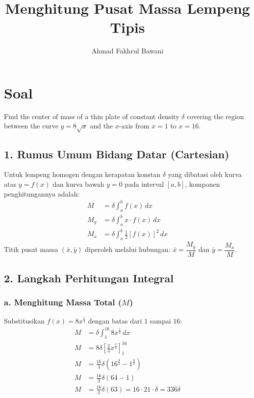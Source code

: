 \documentclass[12pt,a4paper]{article}
\title{Menghitung Pusat Massa Lempeng Tipis}
\author{Ahmad Fakhrul Bawani}
\date{}
\begin{document}
\maketitle

\section*{Soal}

Find the center of mass of a thin plate of constant density $\delta$ covering the region between the curve $y = 8\sqrt{x}$ and the $x$-axis from $x = 1$ to $x = 16$.

\subsection*{1. Rumus Umum Bidang Datar (Cartesian)}
Untuk lempeng homogen dengan kerapatan konstan $\delta$ yang dibatasi oleh kurva atas $y = f(x)$ dan kurva bawah $y = 0$ pada interval $[a, b]$, komponen penghitungannya adalah:
\begin{align*}
  M &= \delta \int_{a}^{b} f(x) \, dx \\
  M_y &= \delta \int_{a}^{b} x \cdot f(x) \, dx \\
  M_x &= \delta \int_{a}^{b} \frac{1}{2} [f(x)]^2 \, dx
\end{align*}
Titik pusat massa $(\bar{x}, \bar{y})$ diperoleh melalui hubungan: $\bar{x} = \dfrac{M_y}{M}$ dan $\bar{y} = \dfrac{M_x}{M}$.

\subsection*{2. Langkah Perhitungan Integral}

\subsubsection*{a. Menghitung Massa Total ($M$)}
Substitusikan $f(x) = 8x^{\frac{1}{2}}$ dengan batas dari $1$ sampai $16$:
\begin{align*}
  M &= \delta \int_{1}^{16} 8x^{\frac{1}{2}} \, dx \\
  M &= 8\delta \left[ \frac{2}{3}x^{\frac{3}{2}} \right]_{1}^{16} \\
  M &= \frac{16}{3}\delta \left( 16^{\frac{3}{2}} - 1^{\frac{3}{2}} \right) \\
  M &= \frac{16}{3}\delta \left( 64 - 1 \right) \\
  M &= \frac{16}{3}\delta (63) = 16 \cdot 21 \cdot \delta = 336\delta
\end{align*}
\end{document}
